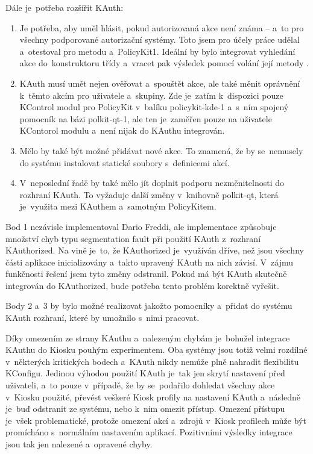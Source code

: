 Dále je~potřeba rozšířit KAuth:
\begin{enumerate}
\item Je potřeba, aby uměl hlásit, pokud autorizovaná akce není známa -- a~to pro všechny podporované autorizační systémy. Toto jsem pro účely práce udělal a~otestoval pro metodu  a~PolicyKit1. Ideální by bylo integrovat vyhledání akce do~konstruktoru třídy  a~vracet pak výsledek pomocí volání její metody .
\item KAuth musí umět nejen ověřovat a~spouštět akce, ale také měnit oprávnění k~těmto akcím pro uživatele a~skupiny. Zde je~zatím k~dispozici pouze KControl modul pro PolicyKit v~balíku policykit-kde-1 a~s~ním spojený pomocník na bázi polkit-qt-1, ale ten je~zaměřen pouze na uživatele KContorol modulu a~není nijak do KAuthu integrován.
\item Mělo by také být možné přidávat nové akce. To znamená, že by se~nemusely do systému instalovat statické soubory s~definicemi akcí.
\item V~neposlední řadě by také mělo jít doplnit podporu nezměnitelnosti do rozhraní KAuth. To vyžaduje další změny v~knihovně polkit-qt, která je~využita mezi KAuthem a~samotným PolicyKitem.
\end{enumerate}

Bod 1 nezávisle implementoval Dario Freddi, ale implementace způsobuje množství chyb typu segmentation fault při použití KAuth z~rozhraní KAuthorized. Na vině je~to, že KAuthorized je~využíván dříve, než jsou všechny části aplikace inicializovány a~takto upravený KAuth na nich závisí. V~zájmu funkčnosti řešení jsem tyto změny odstranil. Pokud má být KAuth skutečně integrován do KAuthorized, bude potřeba tento problém korektně vyřešit.

Body 2 a~3 by bylo možné realizovat jakožto pomocníky a~přidat do systému KAuth rozhraní, které by umožnilo s~nimi pracovat.

Díky omezením ze strany KAuthu a~nalezeným chybám je~bohužel integrace KAuthu do Kiosku pouhým experimentem. Oba systémy jsou totiž velmi rozdílné v~některých kritických bodech a~KAuth nikdy nemůže plně nahradit flexibilitu KConfigu. Jedinou výhodou použití KAuth je~tak jen skrytí nastavení před uživateli, a~to pouze v~případě, že by se~podařilo dohledat všechny akce v~Kiosku použité, převést veškeré Kiosk profily na nastavení KAuth a~následně je~buď odstranit ze systému, nebo k~nim omezit přístup. Omezení přístupu je~všek problematické, protože omezení akcí a~zdrojů v~Kiosk profilech může být promícháno s~normálním nastavením aplikací. Pozitivními výsledky integrace jsou tak jen nalezené a~opravené chyby.

